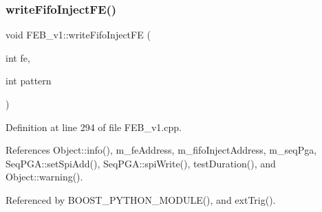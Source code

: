 \mbox{\label{classFEB__v1_ae212b0e4c9824afaebb4508b688f94bf}} 
\subsubsection{\texorpdfstring{write\+Fifo\+Inject\+F\+E()}{writeFifoInjectFE()}}
{\footnotesize\ttfamily void F\+E\+B\+\_\+v1\+::write\+Fifo\+Inject\+FE (\begin{DoxyParamCaption}\item[{int}]{fe,  }\item[{int}]{pattern }\end{DoxyParamCaption})}



Definition at line 294 of file F\+E\+B\+\_\+v1.\+cpp.



References Object\+::info(), m\+\_\+fe\+Address, m\+\_\+fifo\+Inject\+Address, m\+\_\+seq\+Pga, Seq\+P\+G\+A\+::set\+Spi\+Add(), Seq\+P\+G\+A\+::spi\+Write(), test\+Duration(), and Object\+::warning().



Referenced by B\+O\+O\+S\+T\+\_\+\+P\+Y\+T\+H\+O\+N\+\_\+\+M\+O\+D\+U\+L\+E(), and ext\+Trig().


